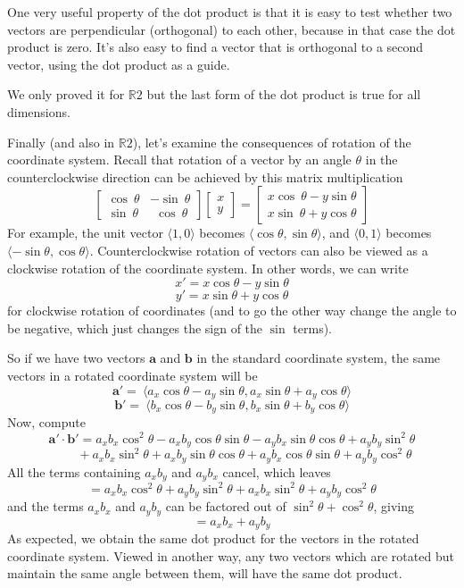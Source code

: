 \documentclass[11pt, oneside]{report}   	%
\begin{document}
One very useful property of the dot product is that it is easy to test whether two vectors are perpendicular (orthogonal) to each other, because in that case the dot product is zero.  It's also easy to find a vector that is orthogonal to a second vector, using the dot product as a guide.

We only proved it for $\mathbb{R}2$ but the last form of the dot product is true for all dimensions.

Finally (and also in $\mathbb{R}2$), let's examine the consequences of rotation of the coordinate system.  Recall that rotation of a vector by an angle $\theta$ in the counterclockwise direction can be achieved by this matrix multiplication
\[
\begin{bmatrix}  
\cos\  \theta & -\sin\  \theta  \\  
\sin\  \theta & \ \ \cos\  \theta  
\end{bmatrix}
\begin{bmatrix}  
x  \\  
y  
\end{bmatrix}
=
\begin{bmatrix}  
x\cos\  \theta - y \sin \theta \\  
x \sin\  \theta + y \cos \theta
\end{bmatrix}
\]
For example, the unit vector $\langle1,0\rangle$ becomes $\langle \cos \theta,\sin \theta \rangle$, and $\langle 0,1\rangle$ becomes $\langle -\sin \theta,\cos \theta \rangle$.  Counterclockwise rotation of vectors can also be viewed as a clockwise rotation of the coordinate system.  In other words, we can write
\[ x' = x\cos \theta - y \sin \theta \]
\[ y' = x \sin \theta + y \cos \theta \]
for clockwise rotation of coordinates (and to go the other way change the angle to be negative, which just changes the sign of the $\sin$ terms).

So if we have two vectors $\mathbf{a}$ and $\mathbf{b}$ in the standard coordinate system, the same vectors in a rotated coordinate system will be
\[ \mathbf{a}' = \ \langle a_x\cos \theta - a_y \sin \theta, a_x \sin \theta + a_y \cos \theta \rangle \]
\[ \mathbf{b}' = \ \langle b_x\cos \theta - b_y \sin \theta, b_x \sin \theta + b_y \cos \theta \rangle \]
Now, compute
\[ \mathbf{a}' \cdot \mathbf{b}' = a_x b_x \cos^2 \theta - a_x b_y \cos \theta \sin \theta - a_y b_x \sin \theta \cos \theta + a_y b_y \sin^2 \theta  \]
\[ \ \ \ \ \ \ \ \ \ + a_x b_x \sin^2 \theta + a_x b_y \sin \theta \cos \theta + a_y b_x \cos \theta \sin \theta + a_y b_y \cos^2 \theta \]
All the terms containing $a_x b_y$ and $a_y b_x$ cancel, which leaves
\[ = a_x b_x \cos^2 \theta + a_y b_y \sin^2 \theta + a_x b_x \sin^2 \theta + a_y b_y \cos^2 \theta \]
and the terms $a_x b_x$ and $a_y b_y$ can be factored out of $\sin^2 \theta + \cos^2 \theta$, giving
\[ = a_x b_x + a_y b_y \]
As expected, we obtain the same dot product for the vectors in the rotated coordinate system.  Viewed in another way, any two vectors which are rotated but maintain the same angle between them, will have the same dot product.
\end{document}
